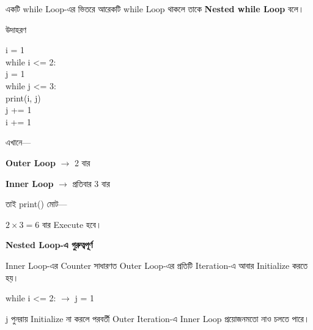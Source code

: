 

একটি
\textenglish{\ttfamily while}
Loop-এর ভিতরে আরেকটি
\textenglish{\ttfamily while}
Loop থাকলে তাকে
\textbf{Nested while Loop} বলে।

\begin{examplebox}{উদাহরণ}

\begin{codebox}
\begin{english}
\ttfamily
i = 1\\[0.5mm]
while i <= 2:\\
\hspace*{4mm}j = 1\\[0.5mm]
\hspace*{4mm}while j <= 3:\\
\hspace*{8mm}print(i, j)\\
\hspace*{8mm}j += 1\\[0.5mm]
\hspace*{4mm}i += 1
\end{english}
\end{codebox}

এখানে—

\begin{center}

\textbf{Outer Loop}
\(\longrightarrow\)
2 বার

\qquad

\textbf{Inner Loop}
\(\longrightarrow\)
প্রতিবার 3 বার

\end{center}

তাই
\textenglish{\ttfamily print()}
মোট—

\begin{center}

\(2 \times 3 = 6\) বার Execute হবে।

\end{center}

\end{examplebox}


\begin{rememberbox}

\textbf{\color{deepOrange}Nested Loop-এ গুরুত্বপূর্ণ}

Inner Loop-এর Counter সাধারণত Outer Loop-এর প্রতিটি Iteration-এ
আবার Initialize করতে হয়।

\begin{center}

\textenglish{\ttfamily while i <= 2:}
\(\longrightarrow\)
\textenglish{\ttfamily j = 1}

\end{center}

\textenglish{\ttfamily j}
পুনরায় Initialize না করলে পরবর্তী Outer Iteration-এ Inner Loop
প্রয়োজনমতো নাও চলতে পারে।

\end{rememberbox}

